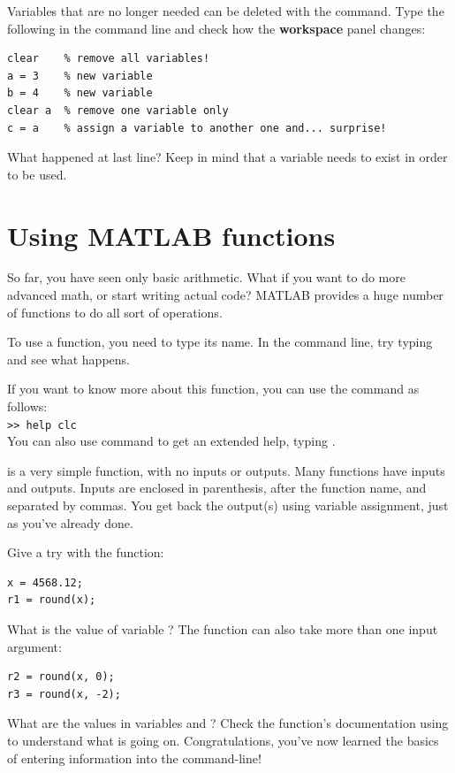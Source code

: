 \documentclass{article}
\begin{document}
Variables that are no longer needed can be deleted with the  command.
Type the following in the command line and check how the \textbf{workspace} panel changes:
\begin{lstlisting}
clear    % remove all variables!
a = 3    % new variable
b = 4    % new variable
clear a  % remove one variable only
c = a    % assign a variable to another one and... surprise!
\end{lstlisting}
What happened at last line? Keep in mind that a variable needs to exist in order to be used.


\section{Using MATLAB functions}

So far, you have seen only basic arithmetic.
What if you want to do more advanced math, or start writing actual code?
MATLAB provides a huge number of functions to do all sort of operations.

To use a function, you need to type its name.
In the command line, try typing  and see what happens.

If you want to know more about this function, you can use the  command as follows: \\
\verb|>> help clc| \\
You can also use  command to get an extended help, typing .

 is a very simple function, with no inputs or outputs. Many functions
have inputs and outputs. Inputs are enclosed in parenthesis, after the function name, 
and separated by commas. You get back the output(s) using variable assignment, just as
you've already done.

Give a try with the  function:
\begin{lstlisting}
x = 4568.12;
r1 = round(x);
\end{lstlisting}
What is the value of variable ? The  function can also take
more than one input argument:


\begin{lstlisting}
r2 = round(x, 0);
r3 = round(x, -2);
\end{lstlisting}
What are the values in variables  and ? Check 
the function's documentation using  to understand what is going on.
Congratulations, you've now learned the basics of entering information into the command-line!
\end{document}
